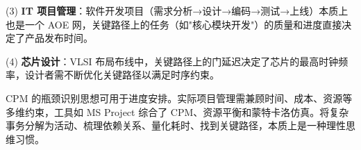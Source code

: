 \noindent\hspace*{2em}(3) \textbf{IT 项目管理}：软件开发项目（需求分析→设计→编码→测试→上线）本质上也是一个 AOE 网，关键路径上的任务（如"核心模块开发"）的质量和进度直接决定了产品发布时间。\par
\noindent\hspace*{2em}(4) \textbf{芯片设计}：VLSI 布局布线中，关键路径上的门延迟决定了芯片的最高时钟频率，设计者需不断优化关键路径以满足时序约束。\par
\noindent\hspace*{2em}CPM 的瓶颈识别思想可用于进度安排。实际项目管理需兼顾时间、成本、资源等多维约束，工具如 MS Project 综合了 CPM、资源平衡和蒙特卡洛仿真。将复杂事务分解为活动、梳理依赖关系、量化耗时、找到关键路径，本质上是一种理性思维习惯。\par

